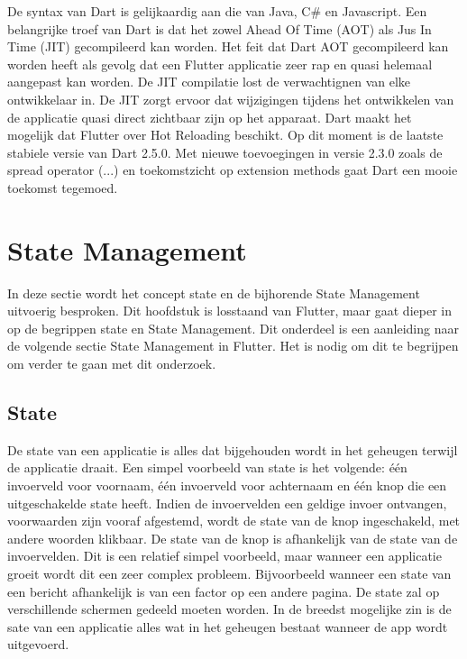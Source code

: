 De syntax van Dart is gelijkaardig aan die van Java, C\# en Javascript.
Een belangrijke troef van Dart is dat het zowel Ahead Of Time (AOT) als Jus In Time (JIT) gecompileerd kan worden. Het feit dat Dart AOT gecompileerd kan worden heeft als gevolg dat een Flutter applicatie zeer rap en quasi helemaal aangepast kan worden.
De JIT compilatie lost de verwachtignen van elke ontwikkelaar in. De JIT zorgt ervoor dat wijzigingen tijdens het ontwikkelen van de applicatie quasi direct zichtbaar zijn op het apparaat. Dart maakt het mogelijk dat Flutter over Hot Reloading beschikt. \autocite{Leler2017a}
\newline
Op dit moment is de laatste stabiele versie van Dart 2.5.0. Met nieuwe toevoegingen in versie 2.3.0 zoals de spread operator (...) en toekomstzicht op extension methods gaat Dart een mooie toekomst tegemoed. \autocite{Thomsen2019}

\section{State Management}
In deze sectie wordt het concept state en de bijhorende State Management uitvoerig besproken. Dit hoofdstuk is losstaand van Flutter, maar gaat dieper in op de begrippen state en State Management. Dit onderdeel is een aanleiding naar de volgende sectie State Management in Flutter. Het is nodig om dit te begrijpen om verder te gaan met dit onderzoek.

\subsection{State}
De state van een applicatie is alles dat bijgehouden wordt in het geheugen terwijl de applicatie draait. \textcite{Coninck2019}
Een simpel voorbeeld van state is het volgende: één invoerveld voor voornaam, één invoerveld voor achternaam en één knop die een uitgeschakelde state heeft. Indien de invoervelden een geldige invoer ontvangen, voorwaarden zijn vooraf afgestemd, wordt de state van de knop ingeschakeld, met andere woorden klikbaar. De state van de knop is afhankelijk van de state van de invoervelden. Dit is een relatief simpel voorbeeld, maar wanneer een applicatie groeit wordt dit een zeer complex probleem. Bijvoorbeeld wanneer een state van een bericht afhankelijk is van een factor op een andere pagina. De state zal op verschillende schermen gedeeld moeten worden.
In de breedst mogelijke zin is de sate van een applicatie alles wat in het geheugen bestaat wanneer de app wordt uitgevoerd. 

